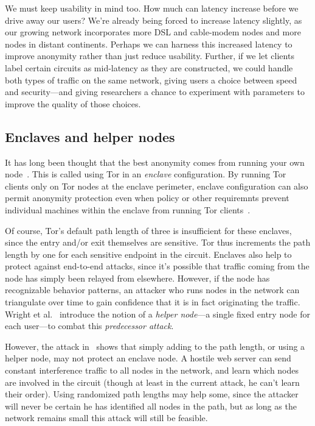 \documentclass{llncs}
\begin{document}
We must keep usability in mind too. How much can latency increase
before we drive away our users? We're already being forced to increase
latency slightly, as our growing network incorporates more DSL and
cable-modem nodes and more nodes in distant continents. Perhaps we can
harness this increased latency to improve anonymity rather than just
reduce usability. Further, if we let clients label certain circuits as
mid-latency as they are constructed, we could handle both types of traffic
on the same network, giving users a choice between speed and security---and
giving researchers a chance to experiment with parameters to improve the
quality of those choices.

\subsection{Enclaves and helper nodes}
\label{subsec:helper-nodes}

It has long been thought that the best anonymity comes from running your
own node~\cite{tor-design,or-ih96,or-pet00}. This is called using Tor in an
\emph{enclave} configuration. By running Tor clients only on Tor nodes
at the enclave perimeter, enclave configuration can also permit anonymity
protection even when policy or other requiremnts prevent individual machines
within the enclave from running Tor clients~\cite{or-jsac98,or-discex00}.

Of course, Tor's default path length of
three is insufficient for these enclaves, since the entry and/or exit
themselves are sensitive. Tor thus increments the path length by one
for each sensitive endpoint in the circuit.
Enclaves also help to protect against end-to-end attacks, since it's
possible that traffic coming from the node has simply been relayed from
elsewhere. However, if the node has recognizable behavior patterns,
an attacker who runs nodes in the network can triangulate over time to
gain confidence that it is in fact originating the traffic. Wright et
al.~\cite{wright03} introduce the notion of a \emph{helper node}---a
single fixed entry node for each user---to combat this \emph{predecessor
attack}.

However, the attack in~\cite{attack-tor-oak05} shows that simply adding
to the path length, or using a helper node, may not protect an enclave
node. A hostile web server can send constant interference traffic to
all nodes in the network, and learn which nodes are involved in the
circuit (though at least in the current attack, he can't learn their
order). Using randomized path lengths may help some, since the attacker
will never be certain he has identified all nodes in the path, but as
long as the network remains small this attack will still be feasible.
\end{document}
